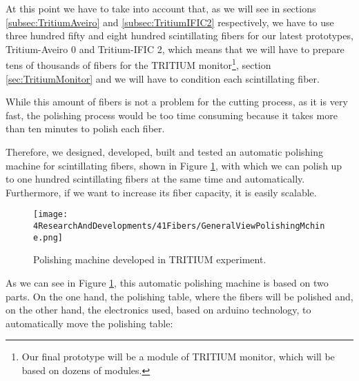 At this point we have to take into account that, as we will see in sections \ref{subsec:TritiumAveiro} and \ref{subsec:TritiumIFIC2} respectively, we have to use three hundred fifty and eight hundred scintillating fibers for our latest prototypes, Tritium-Aveiro 0 and Tritium-IFIC 2, which means that we will have to prepare tens of thousands of fibers for the TRITIUM monitor\footnote{Our final prototype will be a module of TRITIUM monitor, which will be based on dozens of modules.}, section \ref{sec:TritiumMonitor} and we will have to condition each scintillating fiber.

While this amount of fibers is not a problem for the cutting process, as it is very fast, the polishing process would be too time consuming because it takes more than ten minutes to polish each fiber. 

Therefore, we designed, developed, built and tested an automatic polishing machine for scintillating fibers, shown in Figure \ref{fig:GeneralViewPolishingMachine}, with which we can polish up to one hundred scintillating fibers at the same time and automatically. Furthermore, if we want to increase its fiber capacity, it is easily scalable.


\begin{figure}[h]
\centering
\texttt{[image: 4ResearchAndDevelopments/41Fibers/GeneralViewPolishingMchine.png]}
\caption{Polishing machine developed in TRITIUM experiment.\label{fig:GeneralViewPolishingMachine}}
\end{figure}

As we can see in Figure \ref{fig:GeneralViewPolishingMachine}, this automatic polishing machine is based on two parts. On the one hand, the polishing table, where the fibers will be polished and, on the other hand, the electronics used, based on arduino technology, to automatically move the polishing table:


